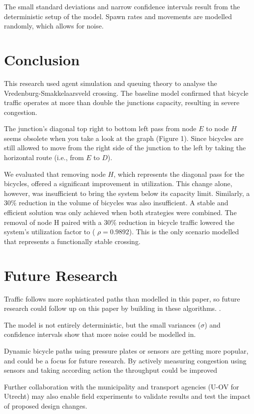 \documentclass[letterpaper, 10 pt, conference]{ieeeconf}
\begin{document}
The small standard deviations and narrow confidence intervals result from the deterministic setup of the model. Spawn rates and movements are modelled randomly, which allows for noise. 

\section{Conclusion}
This research used agent simulation and queuing theory to analyse the Vredenburg-Smakkelaarsveld crossing. The baseline model confirmed that bicycle traffic operates at more than double the junctions capacity, resulting in severe congestion. 

The junction's diagonal top right to bottom left pass from node $E$ to node $H$ seems obsolete when you take a look at the graph (Figure 1). Since bicycles are still allowed to move from the right side of the junction to the left by taking the horizontal route (i.e., from $E$ to $D$).

We evaluated that removing node $H$, which represents the diagonal pass for the bicycles, offered a significant improvement in utilization. This change alone, however, was insufficient to bring the system below its capacity limit. Similarly, a 30\% reduction in the volume of bicycles was also insufficient. A stable and efficient solution was only achieved when both strategies were combined. The removal of node H paired with a 30\% reduction in bicycle traffic lowered the system's utilization factor to ( $\rho=0.9892$). This is the only scenario modelled that represents a functionally stable crossing.

\section{Future Research}
Traffic follows more sophisticated paths than modelled in this paper,  so future research could follow up on this paper by building in these algorithms. \parencite{NI2024100022}.

The model is not entirely deterministic, but the small variances ($\sigma$) and confidence intervals show that more noise could be modelled in.

Dynamic bicycle paths using pressure plates or sensors are getting more popular, and could be a focus for future research. By actively measuring congestion using sensors and taking according action the throughput could be improved \parencite{puts-2018}

Further collaboration with the municipality and transport agencies (U-OV for Utrecht) may also enable
field experiments to validate results and test the impact of proposed design changes.


\newpage

\printbibliography
\end{document}
